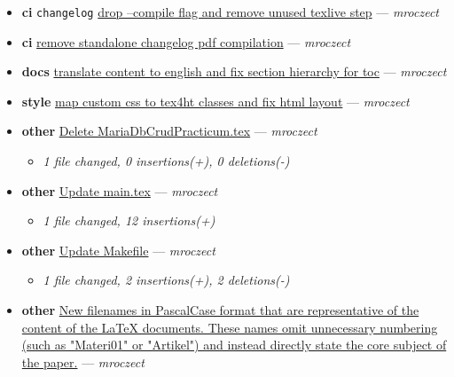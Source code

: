 \begin{itemize}[leftmargin=1.5em]
\begin{itemize}[leftmargin=1.5em]
    \item \small\textit{1 file changed, 477 insertions(+), 49 deletions(-)}
  \end{itemize}
  \item \textbf{ci} \texttt{changelog} \href{https://github.com/mroczect/mroczect.github.io/commit/461071d8abcd4be28b69d201958af878144078d1}{drop --compile flag and remove unused texlive step} --- \textit{mroczect}
  \item \textbf{ci} \href{https://github.com/mroczect/mroczect.github.io/commit/75a7282f9297a396f20c1a15a99336eae97818d9}{remove standalone changelog pdf compilation} --- \textit{mroczect}
  \item \textbf{docs} \href{https://github.com/mroczect/mroczect.github.io/commit/37d477deb2bdf8f43febf5bcb713ab7c6901adb5}{translate content to english and fix section hierarchy for toc} --- \textit{mroczect}
  \item \textbf{style} \href{https://github.com/mroczect/mroczect.github.io/commit/4e6c26fd488fd3c055d0d3868d295ff4551ee8bb}{map custom css to tex4ht classes and fix html layout} --- \textit{mroczect}
  \item \textbf{other} \href{https://github.com/mroczect/mroczect.github.io/commit/73cef1a188251f0e788ad61674c24932ba4e12c3}{Delete MariaDbCrudPracticum.tex} --- \textit{mroczect}
  \begin{itemize}[leftmargin=1.5em]
    \item \small\textit{1 file changed, 0 insertions(+), 0 deletions(-)}
  \end{itemize}
  \item \textbf{other} \href{https://github.com/mroczect/mroczect.github.io/commit/578dad863123d1ee7b329d32f466e63cd6b30fe2}{Update main.tex} --- \textit{mroczect}
  \begin{itemize}[leftmargin=1.5em]
    \item \small\textit{1 file changed, 12 insertions(+)}
  \end{itemize}
  \item \textbf{other} \href{https://github.com/mroczect/mroczect.github.io/commit/41dc59a5e4dba5c963d3f6b5d0163900f3e881ee}{Update Makefile} --- \textit{mroczect}
  \begin{itemize}[leftmargin=1.5em]
    \item \small\textit{1 file changed, 2 insertions(+), 2 deletions(-)}
  \end{itemize}
  \item \textbf{other} \href{https://github.com/mroczect/mroczect.github.io/commit/68aed1f14bcc3b45f159b8af18baa019566c2a5f}{New filenames in PascalCase format that are representative of the content of the LaTeX documents. These names omit unnecessary numbering (such as "Materi01" or "Artikel") and instead directly state the core subject of the paper.} --- \textit{mroczect}

\end{itemize}
